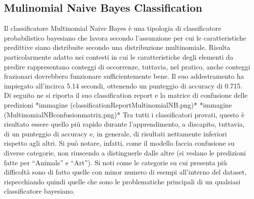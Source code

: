 \documentclass[12pt,oneside]{article}
\begin{document}
    \begin{enumerate}
    \subsection{Mulinomial Naive Bayes Classification}
    \begin{justify}
        Il classificatore Multinomial Naive Bayes è una tipologia di classificatore probabilistico bayesiano che lavora secondo l’assunzione per cui le caratteristiche predittive siano distribuite secondo una distribuzione multinomiale. Risulta particolarmente adatto nei contesti in cui le caratteristiche degli elementi da predire rappresentano conteggi di occorrenze, tuttavia, nel pratico, anche conteggi frazionari dovrebbero funzionare sufficientemente bene.
        Il suo addestramento ha impiegato all’incirca 5.14 secondi, ottenendo un punteggio di accuracy di 0.715. Di seguito ne si riporta il suo classification report e la matrice di confusione delle predizioni
        *immagine (classificationReportMultinomialNB.png)*
        *immagine (MultinomialNBconfusionmatrix.png)*
        Tra tutti i classificatori provati, questo è risultato essere quello più rapido durante l’apprendimento, a discapito, tuttavia, di un punteggio di accuracy e, in generale, di risultati nettamente inferiori rispetto agli altri. Si può notare, infatti, come il modello faccia confusione su diverse categorie, non riuscendo a distinguerle dalle altre (si vedano le predizioni fatte per “Animals” e “Art”). Si noti come le categorie su cui presenta più difficoltà sono di fatto quelle con minor numero di esempi all’interno del dataset, rispecchiando quindi quelle che sono le problematiche principali di un qualsiasi classificatore bayesiano.
    \end{justify}
    \end{enumerate}
    
\end{document}
